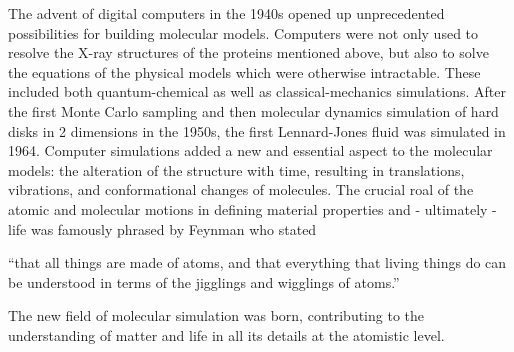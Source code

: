 

The advent of digital computers in the 1940s opened up unprecedented
%
possibilities for
building molecular models. Computers were not only used to resolve the X-ray structures of
the proteins mentioned above, but also to solve the equations of the physical models
which were otherwise intractable. 
%
These included both quantum-chemical as well as classical-mechanics simulations.
%
After the first Monte Carlo sampling\cite{ME53.1}
and then molecular dynamics simulation\cite{AL57.1}
of hard disks in 2 dimensions in the 1950s, 
the first Lennard-Jones fluid was simulated in 1964.\cite{RA64.1}
Computer simulations added a new and essential 
aspect to the molecular models: the alteration of the structure with time, resulting in 
translations, vibrations, and conformational changes of molecules.
%
%
The crucial roal
of the atomic and molecular motions 
in defining material properties and - ultimately - life 
was famously phrased by Feynman who stated\cite{FE63.1}
%
\begin{displayquote}
``that all things are made of atoms, and that everything that living things do can be understood in terms of the jigglings and wigglings of atoms.''
\end{displayquote}
%
The new field of molecular simulation was born, contributing to the
 understanding of matter and life in all its details at the atomistic
level.
%


